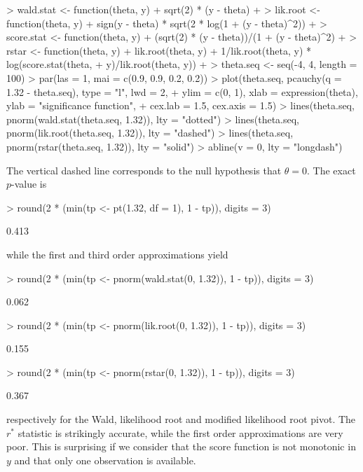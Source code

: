 \documentclass[a4paper,11pt]{article}
\begin{document}
\begin{Schunk}
\begin{Sinput}
> wald.stat <- function(theta, y) {
+     sqrt(2) * (y - theta)
+ }
> lik.root <- function(theta, y) {
+     sign(y - theta) * sqrt(2 * log(1 + (y - theta)^2))
+ }
> score.stat <- function(theta, y) {
+     (sqrt(2) * (y - theta))/(1 + (y - theta)^2)
+ }
> rstar <- function(theta, y) {
+     lik.root(theta, y) + 1/lik.root(theta, y) * log(score.stat(theta, 
+         y)/lik.root(theta, y))
+ }
> theta.seq <- seq(-4, 4, length = 100)
> par(las = 1, mai = c(0.9, 0.9, 0.2, 0.2))
> plot(theta.seq, pcauchy(q = 1.32 - theta.seq), type = "l", lwd = 2, 
+     ylim = c(0, 1), xlab = expression(theta), ylab = "significance function", 
+     cex.lab = 1.5, cex.axis = 1.5)
> lines(theta.seq, pnorm(wald.stat(theta.seq, 1.32)), lty = "dotted")
> lines(theta.seq, pnorm(lik.root(theta.seq, 1.32)), lty = "dashed")
> lines(theta.seq, pnorm(rstar(theta.seq, 1.32)), lty = "solid")
> abline(v = 0, lty = "longdash")
\end{Sinput}
\end{Schunk}
%
The vertical dashed line corresponds to the null hypothesis that $\theta = 0$.  The exact $p$-value is 
%
\begin{Schunk}
\begin{Sinput}
> round(2 * (min(tp <- pt(1.32, df = 1), 1 - tp)), digits = 3)
\end{Sinput}
\begin{Soutput}
[1] 0.413
\end{Soutput}
\end{Schunk}
%
while the first and third order approximations yield 
%
\begin{Schunk}
\begin{Sinput}
> round(2 * (min(tp <- pnorm(wald.stat(0, 1.32)), 1 - tp)), digits = 3)
\end{Sinput}
\begin{Soutput}
[1] 0.062
\end{Soutput}
\begin{Sinput}
> round(2 * (min(tp <- pnorm(lik.root(0, 1.32)), 1 - tp)), digits = 3)
\end{Sinput}
\begin{Soutput}
[1] 0.155
\end{Soutput}
\begin{Sinput}
> round(2 * (min(tp <- pnorm(rstar(0, 1.32)), 1 - tp)), digits = 3)
\end{Sinput}
\begin{Soutput}
[1] 0.367
\end{Soutput}
\end{Schunk}
%
respectively for the Wald, likelihood root and modified likelihood root pivot.  The $r^*$ statistic is strikingly accurate, while the first order approximations are very poor.  This is surprising if we consider that the score function is not monotonic in $y$ and that only one observation is available.  
\end{document}
